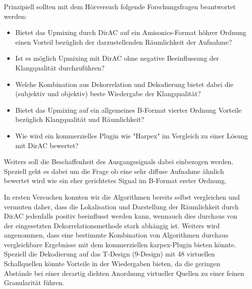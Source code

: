 Prinzipiell sollten mit dem Hörversuch folgende Forschungsfragen beantwortet werden:

\begin{itemize}
	\item Bietet das Upmixing durch DirAC auf ein Amisonics-Format höhrer Ordnung einen Vorteil bezüglich der darzustellenden Räumlichkeit der Aufnahme?
	\item Ist es möglich Upmixing mit DirAC ohne negative Beeinflussung der Klangqualität durchzuführen?
	\item Welche Kombination aus Dekorrelation und Dekodierung bietet dabei die (subjektiv und objektiv) beste Wiedergabe der Klangqualität?
	\item Bietet das Upmixing auf ein allgemeines B-Format vierter Ordnung Vorteile bezüglich Klangqualität und Räumlichkeit?
	\item Wie wird ein kommerzielles Plugin wie "Harpex" im Vergleich zu einer Lösung mit DirAC bewertet?
\end{itemize}

Weiters soll die Beschaffenheit des Ausgangssignals dabei einbezogen werden. Speziell geht es dabei um die Frage ob eine sehr diffuse Aufnahme ähnlich bewertet wird wie ein eher gerichtetes Signal im B-Format erster Ordnung.

In ersten Versuchen konnten wir die Algorithmen bereits selbst vergleichen und vermuten daher, dass die Lokalisation und Darstellung der Räumlichkeit durch DirAC jedenfalls positiv beeinflusst werden kann, wennauch dies durchaus von der eingesetzten Dekorrelationsmethode stark abhängig ist. Weiters wird angenommen, dass eine bestimmte Kombination von Algorithmen durchaus vergleichbare Ergebnisse mit dem kommerziellen karpex-Plugin bieten könnte. Speziell die Dekodierung auf das T-Design (9-Design) mit 48 virtuellen Schallquellen könnte Vorteile in der Wiedergaben bieten, da die geringen Abstände bei einer derartig dichten Anordnung virtueller Quellen zu einer feinen Granularität führen.
